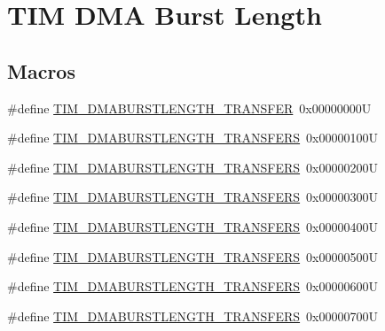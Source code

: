 \hypertarget{group___t_i_m___d_m_a___burst___length}{}\section{T\+IM D\+MA Burst Length}
\label{group___t_i_m___d_m_a___burst___length}
\subsection*{Macros}
\begin{DoxyCompactItemize}
\item 
\#define \mbox{\hyperlink{group___t_i_m___d_m_a___burst___length_ga74f07b4a10022d71f31ec6e1b2b69276}{T\+I\+M\+\_\+\+D\+M\+A\+B\+U\+R\+S\+T\+L\+E\+N\+G\+T\+H\+\_\+T\+R\+A\+N\+S\+F\+ER}}~0x00000000U
\item 
\#define \mbox{\hyperlink{group___t_i_m___d_m_a___burst___length_gab114592091a00e0a6b9ae464485bd7bb}{T\+I\+M\+\_\+\+D\+M\+A\+B\+U\+R\+S\+T\+L\+E\+N\+G\+T\+H\+\_\+T\+R\+A\+N\+S\+F\+E\+RS}}~0x00000100U
\item 
\#define \mbox{\hyperlink{group___t_i_m___d_m_a___burst___length_gad91c14f0930803593ecdbd98002fea0a}{T\+I\+M\+\_\+\+D\+M\+A\+B\+U\+R\+S\+T\+L\+E\+N\+G\+T\+H\+\_\+T\+R\+A\+N\+S\+F\+E\+RS}}~0x00000200U
\item 
\#define \mbox{\hyperlink{group___t_i_m___d_m_a___burst___length_ga9ada9605ae6ff6e4ada9701263bef812}{T\+I\+M\+\_\+\+D\+M\+A\+B\+U\+R\+S\+T\+L\+E\+N\+G\+T\+H\+\_\+T\+R\+A\+N\+S\+F\+E\+RS}}~0x00000300U
\item 
\#define \mbox{\hyperlink{group___t_i_m___d_m_a___burst___length_ga740a6446c0a517cc3e235fddee45fef5}{T\+I\+M\+\_\+\+D\+M\+A\+B\+U\+R\+S\+T\+L\+E\+N\+G\+T\+H\+\_\+T\+R\+A\+N\+S\+F\+E\+RS}}~0x00000400U
\item 
\#define \mbox{\hyperlink{group___t_i_m___d_m_a___burst___length_ga905c206d2a028e3fb92bcab8f9f7c869}{T\+I\+M\+\_\+\+D\+M\+A\+B\+U\+R\+S\+T\+L\+E\+N\+G\+T\+H\+\_\+T\+R\+A\+N\+S\+F\+E\+RS}}~0x00000500U
\item 
\#define \mbox{\hyperlink{group___t_i_m___d_m_a___burst___length_gae75055ac13b73baf9326f1d6157853a7}{T\+I\+M\+\_\+\+D\+M\+A\+B\+U\+R\+S\+T\+L\+E\+N\+G\+T\+H\+\_\+T\+R\+A\+N\+S\+F\+E\+RS}}~0x00000600U
\item 
\#define \mbox{\hyperlink{group___t_i_m___d_m_a___burst___length_gac6b24f5b7d9e1968b4bfcaeb24e718fc}{T\+I\+M\+\_\+\+D\+M\+A\+B\+U\+R\+S\+T\+L\+E\+N\+G\+T\+H\+\_\+T\+R\+A\+N\+S\+F\+E\+RS}}~0x00000700U
\item 

\end{DoxyCompactItemize}
